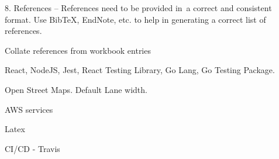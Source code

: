 \documentclass[a4paper,11pt]{article}
\begin{document}
\printbibliography{}

8. References – References need to be provided in a correct and consistent format. Use BibTeX, EndNote, etc. to help in generating a correct list of references.


Collate references from workbook entries

React, NodeJS, Jest, React Testing Library, Go Lang, Go Testing Package.

Open Street Maps.
Default Lane width.


AWS services

Latex

CI/CD - Travis
\end{document}
